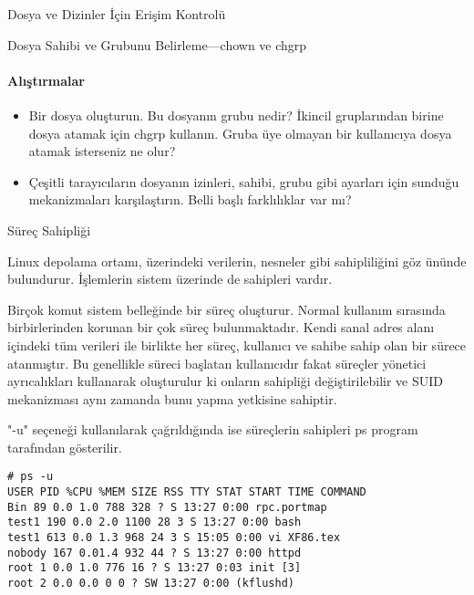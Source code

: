 \begin{section}{Dosya ve Dizinler İçin Erişim Kontrolü}
\begin{subsection}{Dosya Sahibi ve Grubunu Belirleme—chown ve chgrp}
\paragraph{Alıştırmalar}{
\begin{itemize}
 \item Bir dosya oluşturun. Bu dosyanın grubu nedir? İkincil gruplarından birine dosya atamak için chgrp kullanın. Gruba üye olmayan bir kullanıcıya dosya atamak isterseniz ne olur?
 \item Çeşitli tarayıcıların dosyanın izinleri, sahibi, grubu gibi ayarları için sunduğu mekanizmaları karşılaştırın. Belli başlı farklılıklar var mı?
 \end{itemize}}
\end{subsection}
\end{section}
\begin{section}{Süreç Sahipliği}

Linux depolama ortamı, üzerindeki verilerin, nesneler gibi sahipliliğini göz ününde bulundurur. İşlemlerin sistem üzerinde de sahipleri vardır.

Birçok komut sistem belleğinde bir süreç oluşturur. Normal kullanım sırasında birbirlerinden korunan bir çok süreç bulunmaktadır. Kendi sanal adres alanı içindeki tüm verileri ile birlikte her süreç, kullanıcı ve sahibe sahip olan bir sürece atanmıştır. Bu genellikle süreci başlatan kullanıcıdır fakat süreçler yönetici ayrıcalıkları kullanarak oluşturulur ki onların sahipliği değiştirilebilir ve SUID mekanizması aynı zamanda bunu yapma yetkisine sahiptir.
 
"-u" seçeneği kullanılarak çağrıldığında ise süreçlerin sahipleri ps program tarafından gösterilir.
\begin{verbatim}
# ps -u
USER PID %CPU %MEM SIZE RSS TTY STAT START TIME COMMAND
Bin 89 0.0 1.0 788 328 ? S 13:27 0:00 rpc.portmap
test1 190 0.0 2.0 1100 28 3 S 13:27 0:00 bash
test1 613 0.0 1.3 968 24 3 S 15:05 0:00 vi XF86.tex
nobody 167 0.01.4 932 44 ? S 13:27 0:00 httpd
root 1 0.0 1.0 776 16 ? S 13:27 0:03 init [3]
root 2 0.0 0.0 0 0 ? SW 13:27 0:00 (kflushd)
\end{verbatim}
\end{section}
